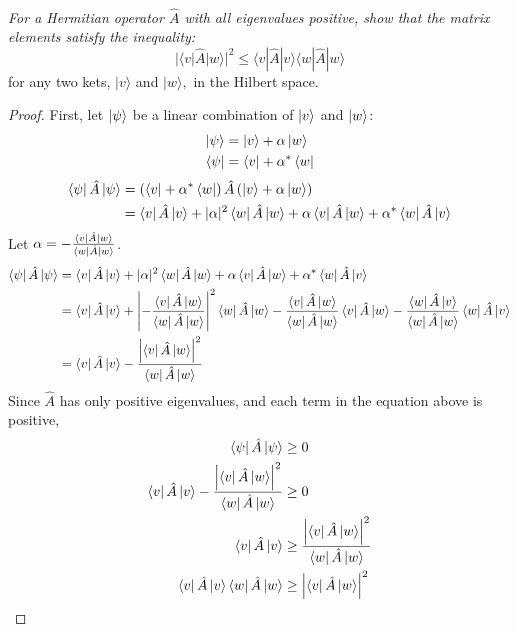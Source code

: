 \documentclass{article}
\begin{document}
\subsection{}
\textit{For a Hermitian operator $\hat{A}$ with all eigenvalues positive, show that the matrix elements satisfy the inequality:}
$$
|\langle v|\hat{A}| w\rangle|^{2} \leq\langle v|\hat{A}| v\rangle\langle w|\hat{A}| w\rangle
$$ for any two kets, $|v\rangle$ and $|w\rangle,$ in the Hilbert space.
\begin{proof}
First, let $\ket{\psi}$ be a linear combination of $\ket{v}$ and $\ket{w}$:
\begin{align*}
    \ket{\psi} &= \ket{v} +\alpha \ket{w} \\
    \bra{\psi}&= \bra{v} +\alpha^* \bra{w}
\end{align*}
\begin{align*}
    \bra\psi \hat{A} \ket\psi&= \left(\bra{v} +\alpha^* \bra{w}\right) \hat{A} \left(\ket{v} +\alpha \ket{w}\right)\\
    & =\bra{v}\hat{A} \ket{v}+|\alpha|^{2} \bra{w} \hat{A}  \ket{w} + \alpha \bra{v}\hat{A} \ket{w}+\alpha^{*}\bra{w}\hat{A} \ket{v}
\end{align*}
Let $\alpha = -\frac{\bra{v}\hat{A} \ket{w}}{\bra{w} \hat{A} \ket{w}}$.
\begin{align*}
    \bra\psi \hat{A} \ket\psi& =\bra{v}\hat{A} \ket{v}+|\alpha|^{2} \bra{w} \hat{A}  \ket{w} + \alpha \bra{v}\hat{A} \ket{w}+\alpha^{*}\bra{w}\hat{A} \ket{v}\\
    & =\bra{v}\hat{A} \ket{v}+\left| -\frac{\bra{v}\hat{A} \ket{w}}{\bra{w} \hat{A} \ket{w}}\right|^{2} \bra{w} \hat{A}  \ket{w}  -\frac{\bra{v}\hat{A} \ket{w}}{\bra{w} \hat{A} \ket{w}} \bra{v}\hat{A} \ket{w} -\frac{\bra{w}\hat{A} \ket{v}}{\bra{w} \hat{A} \ket{w}}\bra{w}\hat{A} \ket{v} \\
    &= \bra{v}\hat{A} \ket{v} - \frac{\left|\bra{v} \hat{A} \ket{w} \right|^2}{\bra{w} \hat{A} \ket{w}}
\end{align*}
Since $\hat{A}$ has only positive eigenvalues, and each term in the equation above is positive, 
\begin{align*}
     \bra\psi \hat{A} \ket\psi &\geq 0\\
     \bra{v}\hat{A} \ket{v} - \frac{\left|\bra{v} \hat{A} \ket{w} \right|^2}{\bra{w} \hat{A} \ket{w}} &\geq 0\\
     \bra{v}\hat{A} \ket{v} &\geq \frac{\left|\bra{v} \hat{A} \ket{w} \right|^2}{\bra{w} \hat{A} \ket{w}}\\
     \bra{v}\hat{A} \ket{v} \bra{w} \hat{A} \ket{w} &\geq \left|\bra{v} \hat{A} \ket{w} \right|^2
\end{align*}
\end{proof}
    
\end{document}
